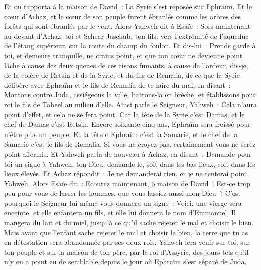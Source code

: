 \begin{multicols}{2}
Et on rapporta à la maison de David~: La Syrie s'est reposée sur Ephraïm. Et le cœur d'Achaz, et le cœur de son peuple furent ébranlés comme les arbres des forêts qui sont ébranlés par le vent.
Alors Yahweh dit à Esaïe~: Sors maintenant au devant d'Achaz, toi et Schear-Jaschub, ton fils, vers l'extrémité de l'aqueduc de l'étang supérieur, sur la route du champ du foulon.
Et dis-lui~: Prends garde à toi, et demeure tranquille, ne crains point, et que ton cœur ne devienne point lâche à cause des deux queues de ces tisons fumants, à cause de l'ardeur, dis-je, de la colère de Retsin et de la Syrie, et du fils de Remalia,
de ce que la Syrie délibère avec Ephraïm et le fils de Remalia de te faire du mal, en disant~:
Montons contre Juda, assiégeons la ville, battons-la en brèche, et établissons pour roi le fils de Tabeel au milieu d'elle.
Ainsi parle le Seigneur, Yahweh~: Cela n'aura point d'effet, et cela ne se fera point.
Car la tête de la Syrie c'est Damas, et le chef de Damas c'est Retsin. Encore soixante-cinq ans, Ephraïm sera froissé pour n'être plus un peuple.
Et la tête d'Ephraïm c'est la Samarie, et le chef de la Samarie c'est le fils de Remalia. Si vous ne croyez pas, certainement vous ne serez point affermis.
Et Yahweh parla de nouveau à Achaz, en disant~:
Demande pour toi un signe à Yahweh, ton Dieu, demande-le, soit dans les bas lieux, soit dans les lieux élevés.
Et Achaz répondit~: Je ne demanderai rien, et je ne tenterai point Yahweh.
Alors Esaïe dit~: Ecoutez maintenant, ô maison de David~! Est-ce trop peu pour vous de lasser les hommes, que vous lassiez aussi mon Dieu~?
C'est pourquoi le Seigneur lui-même vous donnera un signe~: Voici, une vierge sera enceinte, et elle enfantera un fils, et elle lui donnera le nom d'Emmanuel.
Il mangera du lait et du miel, jusqu'à ce qu'il sache rejeter le mal et choisir le bien.
Mais avant que l'enfant sache rejeter le mal et choisir le bien, la terre que tu as en détestation sera abandonnée par ses deux rois.
Yahweh fera venir sur toi, sur ton peuple et sur la maison de ton père, par le roi d'Assyrie, des jours tels qu'il n'y en a point eu de semblable depuis le jour où Ephraïm s'est séparé de Juda.

\end{multicols}
